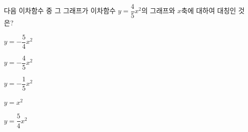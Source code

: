 다음 이차함수 중 그 그래프가 이차함수 $y=\dfrac{4}{5}x^2$의 그래프와 $x$축에 대하여 대칭인 것은?
\begin{choices32}{\rule[-3ex]{0pt}{8ex}$y=-\dfrac{5}{4}x^2$}{\rule[-3ex]{0pt}{8ex}$y=-\dfrac{4}{5}x^2$}{\rule[-3ex]{0pt}{8ex}$y=-\dfrac{1}{5}x^2$}{\rule[-3ex]{0pt}{8ex}$y=x^2$}{\rule[-3ex]{0pt}{8ex}$y=\dfrac{5}{4}x^2$}\end{choices32}
